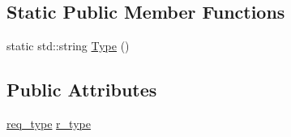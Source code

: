 \subsection*{Static Public Member Functions}
\begin{DoxyCompactItemize}
\item 
static std\-::string \hyperlink{structrplidar__request_a9b610deef1856be76f6a5b2a43275859}{Type} ()
\end{DoxyCompactItemize}
\subsection*{Public Attributes}
\begin{DoxyCompactItemize}
\item 
\hyperlink{structrplidar__request_a7a2aceb50d6779e0d0ca188d18542c75}{req\-\_\-type} \hyperlink{structrplidar__request_a11eebc40e0444f2a73765fbb08953fc4}{r\-\_\-type}
\end{DoxyCompactItemize}


